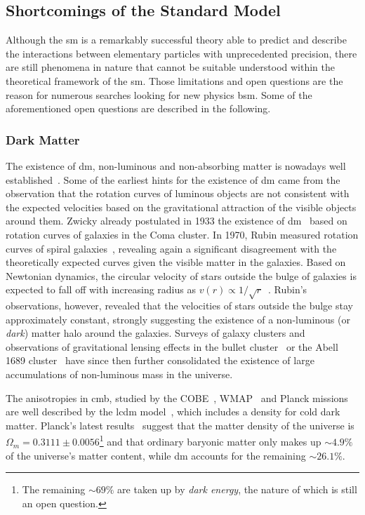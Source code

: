 \subsection{Shortcomings of the Standard Model}

Although the \gls{sm} is a remarkably successful theory able to predict and describe the interactions between elementary particles with unprecedented precision, there are still phenomena in nature that cannot be suitable understood within the theoretical framework of the \gls{sm}. Those limitations and open questions are the reason for numerous searches looking for new physics \gls{bsm}. Some of the aforementioned open questions are described in the following. 

\subsubsection{Dark Matter}

The existence of \gls{dm}, \ie non-luminous and non-absorbing matter is nowadays well established~\cite{pdg2020}. Some of the earliest hints for the existence of \gls{dm} came from the observation that the rotation curves of luminous objects are not consistent with the expected velocities based on the gravitational attraction of the visible objects around them. Zwicky already postulated in 1933 the existence of \gls{dm}~\cite{Zwicky:437297} based on rotation curves of galaxies in the Coma cluster. In 1970, Rubin measured rotation curves of spiral galaxies~\cite{Rubin:1970zza}, revealing again a significant disagreement with the theoretically expected curves given the visible matter in the galaxies. Based on Newtonian dynamics, the circular velocity of stars outside the bulge of galaxies is expected to fall off with increasing radius as $v(r) \propto 1/\sqrt{r}$~\cite{Bertone:2004pz}. Rubin's observations, however, revealed that the velocities of stars outside the bulge stay approximately constant, strongly suggesting the existence of a non-luminous (or \textit{dark}) matter halo around the galaxies. Surveys of galaxy clusters and observations of gravitational lensing effects \eg in the bullet cluster~\cite{Clowe:2006eq} or the Abell 1689 cluster~\cite{Taylor:1998uk} have since then further consolidated the existence of large accumulations of non-luminous mass in the universe.

The anisotropies in \gls{cmb}, studied by the COBE~\cite{Bennett:1996ce,COBE}, WMAP~\cite{WMAP2,WMAP1} and Planck missions~\cite{Planck} are well described by the \gls{lcdm} model~\cite{Liddle:1976476}, which includes a density for cold dark matter. Planck's latest results~\cite{Aghanim:2018eyx} suggest that the matter density of the universe is $\Omega_m = 0.3111\pm 0.0056$\footnote{The remaining $\sim 69\%$ are taken up by \textit{dark energy}, the nature of which is still an open question.} and that ordinary baryonic matter only makes up $\sim 4.9\%$ of the universe's matter content, while \gls{dm} accounts for the remaining $\sim 26.1\%$.

